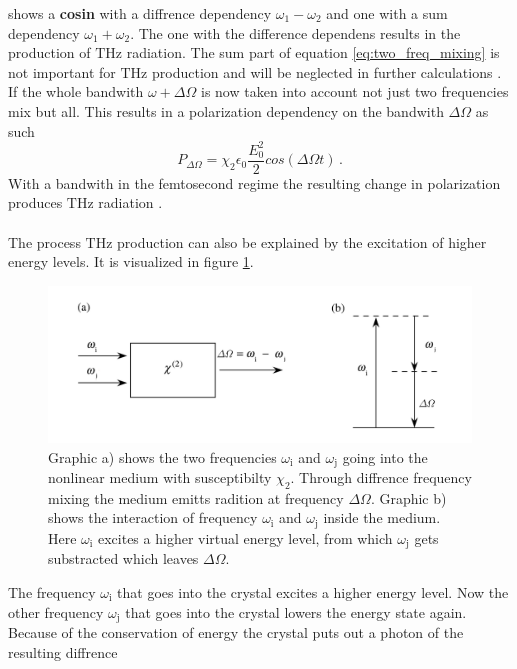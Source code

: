 shows a \textbf{cosin} with a diffrence dependency $\omega_1-\omega_2$ and one with a sum dependency $\omega_1+\omega_2$.
The one with the difference dependens results in the production of $\si{\tera\hertz}$ radiation. %
The sum part of equation \eqref{eq:two_freq_mixing} is not important for $\si{\tera\hertz}$ production and will be neglected in further calculations \cite[45--46]{wiki_book}.
If the whole bandwith $\omega + \Delta\Omega$ is now taken into account not just two frequencies mix but all.
This results in a polarization dependency on the bandwith $\Delta\Omega$ as such
\begin{equation}
    P_{\Delta\Omega} = \chi_2 \epsilon_0 \frac{E_0^2}{2}cos(\Delta\Omega t) \, .
\end{equation}
With a bandwith in the femtosecond regime the resulting change in polarization produces $\si{\tera\hertz}$ radiation \cite[289--291]{book_optical_rectification}\cite[46]{wiki_book}.
\\\\
The process $\si{\tera\hertz}$ production can also be explained by the excitation of higher energy levels.
It is visualized in figure \ref{fig:freq_mix}.
\begin{figure}
    \centering
    \includegraphics[width=\textwidth]{refferenced_pic/diffrence_frequency_mixing.PNG}
    \caption{Graphic a) shows the two frequencies $\omega_\text{i} $ and $\omega_\text{j}$ going into the nonlinear medium with susceptibilty $\chi_2$.
    Through diffrence frequency mixing the medium emitts radition at frequency $\Delta\Omega$.
    Graphic b) shows the interaction of frequency $\omega_\text{i} $ and $\omega_\text{j}$ inside the medium.
    Here $\omega_\text{i}$ excites a higher virtual energy level, from which $\omega_\text{j}$ gets substracted which leaves $\Delta\Omega$.}
    \label{fig:freq_mix}
\end{figure}
The frequency $\omega_\text{i}$ that goes into the crystal excites a higher energy level.
Now the other frequency $\omega_\text{j}$ that goes into the crystal lowers the energy state again.
Because of the conservation of energy the crystal puts out a photon of the resulting diffrence

